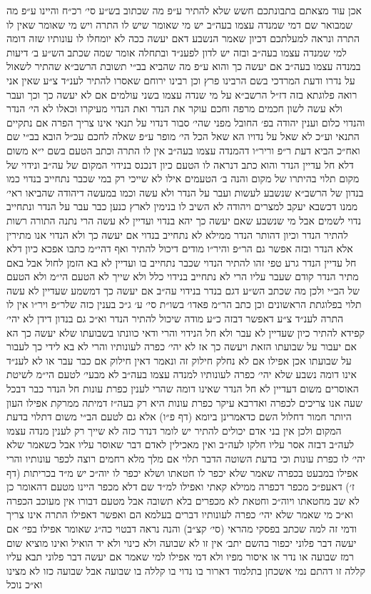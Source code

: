 \documentclass[12pt, openany]{book}
\begin{document}
\begin{multicols}{2}
אכן עוד מצאתם בתבונתכם חשש שלא להתיר ע״פ מה שכתוב בש״ע סי׳ רכ״ח והיינו ע״פ מה שמבואר שם דמי שמנדה עצמו בעה״ב יש מי שאומר שיש לו התרה ויש מי שאומר שאין לו התרה ונראה למעלתכם דכיון שאמר הנשבע דאם יעשה ככה לא יומחלו לו עונותיו שזה דומה למי שמנדה עצמו בעה״ב ובזה יש לדון לפענ״ד ובתחלה אומר שמה שכתב הש״ע ב׳ דיעות במנדה עצמו בעה״ב אם יעשה כך והוא ע״פ מה שהביא בב״י תשובת הרשב״א שהתיר לשאול על נדרו ודעת המרדכי בשם הרבינו פרץ וכן רבינו ירוחם שאסרו להתיר לענ״ד צ״ע שאין אני רואה פלוגתא בזה דז״ל הרשב״א על מי שנדה עצמו בשני עולמים אם לא יעשה כך וכך ועבר ולא עשה לשון חכמים מרפה וחכם עוקר את הנדר ואת הנדוי מעיקרו וכאלו לא הי׳ הנדר והנדוי כלום וענין יהודה בפ׳ החובל מפני שהי׳ סבור דנדוי על תנאי אינו צריך הפרה אם נתקיים התנאי וע״כ לא שאל על נדויו הא שאל הכל הי׳ מופר ע״פ שאלה לחכם עכ״ל הובא בב״י שם ואח״כ הביא דעת ר״פ וריר״ו דהמנדה עצמו בעה״ב אין לו התרה וכתב הטעם בשם י״א משום דלא חל עדיין הנדר והוא כתב דנראה לו הטעם כיון דנכנס בנידוי המקום של עה״ב ונידוי של מקום תלוי בהיתרו של מקום והנה ב׳ הטעמים אילו לא שייכי רק במי שכבר נתחייב בנדוי כמו בנדון של הרשב״א שנשבע לעשות ועבר על הנדר ולא עשה וכמו במעשה דיהודה שהביאו ראי׳ ממנו דכשבא יעקב למצרים ויהודה לא השיב לו בנימין לארץ כנען כבר עבר על הנדר ונתחייב נדוי לשמים אבל מי שנשבע שאם יעשה כך יהא בנדוי ועדיין לא עשה הרי נתנה התורה רשות להתיר הנדר וכיון דהותר הנדר ממילא לא נתחייב בנדוי אם יעשה כך ולא הנדוי אנו מתירין אלא הנדר ובזה אפשר גם הר״פ והיר״ו מודים דיכול להתיר ואף דהי״מ כתבו אפכא כיון דלא חל עדיין הנדר גרע טפי זהו להתיר הנדוי שכבר נתחייב בו ועדיין לא בא הזמן לחול אבל באם מתיר הנדר קודם שעבר עליו הרי לא נתחייב בנידוי כלל ולא שייך לא הטעם הי״מ ולא הטעם של הב״י ולכן מה שכתב הש״ע דגם בנדר בנידוי עה״ב אם יעשה כך דמשמע שעדיין לא עשה תלוי בפלוגתת הראשונים וכן כתב הר״מ פאדו׳ בשו״ת סי׳ ע׳ ג״כ בענין כזה שלר״פ ויר״ו אין לו התרה לענ״ד צ״ע דאפשר דבזה כ״ע מודה שיכול להתיר הנדר וא״כ גם בנדון דידן לא יהי׳ קפידא להתיר כיון שעדיין לא עבר ולא חל הנידוי והרי ודאי כוונתו בשבועתו שלא יעשה כך הא אם יעבור על שבועתו הזאת ויעשה כך אז לא יהי׳ כפרה לעונותיו והרי לא בא לידי כך לעבור על שבועתו אכן אפילו אם לא נחלק חילוק זה ונאמר דאין חילוק אם כבר עבר או לא לענ״ד אינו דומה נשבע שלא יהי׳ כפרה לעונותיו למנדה עצמו בעה״ב לא מבעי׳ לטעם הי״מ לשיטת האוסרים משום דעדיין לא חל הנדר שאינו דומה שהרי לענין כפרת עונות חל הנדר כבר דבכל שעה אנו צריכים לכפרה ואדרבא עיקר כפרת עונות היא רק בעה״ז דמיתה ממרקת אפילו העון היותר חמור דחלול השם כדאמרינן ביומא (דף פ״ו) אלא גם לטעם הב״י משום דתלוי בדעת המקום ולכן אין בני אדם יכולים להתיר יש לומר דנדר כזה לא שייך רק לענין מנדה עצמו לעה״ב דבזה אסר עליו חלקו לעה״ב ואין מאכילין לאדם דבר שאוסר עליו אבל כשאמר שלא יהי׳ לו כפרת עונות וכי בדעת השוטה הדבר תלוי אם מלך מלא רחמים רוצה לכפר עונותיו והרי אפילו במבעט בכפרה שאמר שלא יכפר לו חטאתו ושלא יכפר לו יוה״כ יש מ״ד בכריתות (דף ז׳) דאעפ״כ מכפר דכפרה ממילא קאתי ואפילו למ״ד שם דלא מכפר היינו מטעם דהאומר כן לא שב מחטאתו ויוה״כ וחטאת לא מכפרים בלא תשובה אבל מטעם דבורו אין מעוכב הכפרה וא״כ מי שאמר שלא יהי׳ כפרה לעונותיו דברים בעלמא הם ואפשר דאפילו התרה אינו צריך ודמי זה למה שכתב בפסקי מהראי (סי׳ קצ״ב) והנה נראה דבטוי כה״ג שאומר אפילו בפי׳ אם יעשה דבר פלוני יכפור בהשם יתב׳ אין זו לא שבועה ולא כינוי ולא יד הואיל ואינו מוציא שום רמז שבועה או נדר או איסור מפיו ולא דמי אפילו למי שאמר אם יעשה דבר פלוני תבא עליו קללה זו דהתם נמי אשכחן בתלמוד דארור בו נדוי בו קללה בו שבועה אבל שבועה כזו לא מצינו וא״כ נוכל 
\end{multicols}
\end{document}
